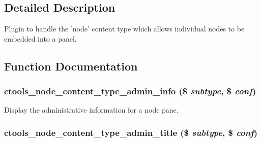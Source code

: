 \subsection{Detailed Description}
Plugin to handle the 'node' content type which allows individual nodes to be embedded into a panel. 

\subsection{Function Documentation}
\hypertarget{ctools_2plugins_2content__types_2node_2node_8inc_ab78d8c471389b734471e970cef7f7270}{
\subsubsection[{ctools\_\-node\_\-content\_\-type\_\-admin\_\-info}]{\setlength{\rightskip}{0pt plus 5cm}ctools\_\-node\_\-content\_\-type\_\-admin\_\-info (\$ {\em subtype}, \/  \$ {\em conf})}}
\label{ctools_2plugins_2content__types_2node_2node_8inc_ab78d8c471389b734471e970cef7f7270}
Display the administrative information for a node pane. \hypertarget{ctools_2plugins_2content__types_2node_2node_8inc_a068ff2b8f4980d9298271e438ce07811}{
\subsubsection[{ctools\_\-node\_\-content\_\-type\_\-admin\_\-title}]{\setlength{\rightskip}{0pt plus 5cm}ctools\_\-node\_\-content\_\-type\_\-admin\_\-title (\$ {\em subtype}, \/  \$ {\em conf})}}
\label{ctools_2plugins_2content__types_2node_2node_8inc_a068ff2b8f4980d9298271e438ce07811}
